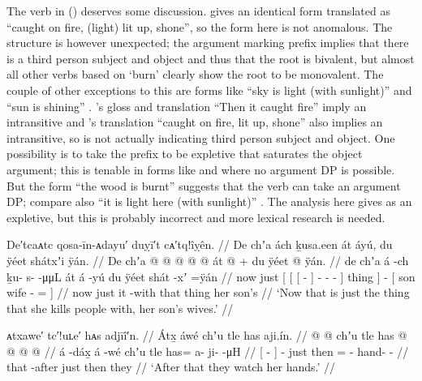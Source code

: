 The verb in (\lastx) deserves some discussion.
\textcite[646]{leer:1976} gives an identical form translated as “caught on fire, (light) lit up, shone”, so the form here is not anomalous.
The structure is however unexpected; the argument marking prefix  implies that there is a third person subject and object and thus that the root is bivalent, but almost all other verbs based on  ‘burn’ clearly show the root to be monovalent.
The couple of other exceptions to this are forms like  “sky is light (with sunlight)” \parencite[646]{leer:1976} and  “sun is shining” \parencite[647]{leer:1976}.
\citeauthor{swanton:1909}’s gloss and translation “Then it caught fire” imply an intransitive and \citeauthor{leer:1976}’s translation “caught on fire, lit up, shone” also implies an intransitive, so  is not actually indicating third person subject and object.
One possibility is to take the  prefix to be expletive that saturates the object argument; this is tenable in forms like  and  where no argument DP is possible.
But the form  “the wood is burnt” \parencite[38.356]{story-naish:1973} suggests that the verb can take an argument DP; compare also  “it is light here (with sunlight)” \parencite[646]{leer:1976}.
The analysis here gives  as an expletive, but this is probably incorrect and more lexical research is needed.

\ex\label{ex:92-130-what-kills-with}%
%
\begingl
	\glpreamble	De′tcaᴀtc qosa-īn-ᴀdayu′ duỵī′t cᴀ′tq!îỵên. //
	\glpreamble	De chʼa ách ḵusa.een át áyú, du ÿéet shátxʼi ÿán. //
	\gla	De chʼa
		{} {} {}  @ {} {}
			 @ {} @ {} @ {} @ {} {} át {}
		 @ {} +
		{} du ÿéet  @ {} \•ÿán. {} //
	\glb	de chʼa
		{} {} {} á -ch {}
			ḵu- s-  -μμL {} {} át {}
		á -yú
		{} du ÿéet shát -xʼ =ÿán {} //
	\glc	now just
		{}[ {}[ {}[  - {}]
			- -  - \· {}]
		thing {}]
		 -
		{}[  son wife - = {}] //
	\gld	now just
		{} {} {} it -with {}
			 {} {} {} \·that {}
		thing {}
		 {}
		{} her son’s  {} {} {} //
	\glft	‘Now that is just the thing that she kills people with, her son’s wives.’
		//
\endgl
\xe

\ex\label{ex:92-131-watch-hands}%
%
\begingl
	\glpreamble	ᴀtxawe′ tc′!uʟe′ hᴀs adjīî′n. //
	\glpreamble	Átx̱ áwé chʼu tle has aji.ín. //
	\gla	{}  @ {} {}  @ {}
		chʼu tle has @  @ {} @ {} @ {} //
	\glb	{} á -dáx̱ {} á -wé
		chʼu tle has= a- ji-  -μH //
	\glc	{}[  - {}]  -
		just then = - hand-  - //
	\gld	{} that -after {}  {}
		just then they  {} {} {} //
	\glft	‘After that they watch her hands.’
		//
\endgl
\xe


